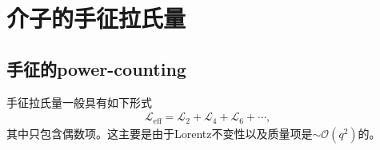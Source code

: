 \documentclass[aps,tightenlines,16pt]{ctexart}
\numberwithin{equation}{section}
\newcommand{\mO}{\mathcal{O}}
\newcommand{\mL}{\mathcal{L}}
\newcommand{\bm}[1]{\mbox{\boldmath{$#1$}}}
\begin{document}


\newpage

\section{介子的手征拉氏量}
\subsection{手征的power-counting}
手征拉氏量一般具有如下形式
\begin{align}
   \mL_{\text{eff}} = \mL_2 + \mL_4 + \mL_6+\cdots,
\end{align}
其中只包含偶数项。这主要是由于Lorentz不变性以及质量项是$\sim\mO(q^2)$的。
\end{document}

